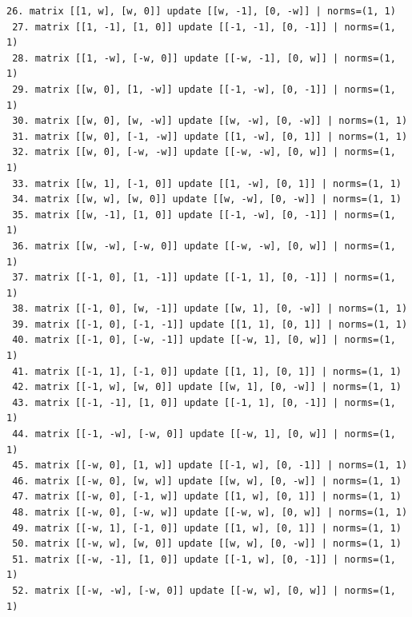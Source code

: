 \documentclass[runningheads]{llncs}
\begin{document}
\begin{lstlisting}[caption={Output candidate matrices, update matrices, and their respective norms.  The claim for \(d=1\) is easily verified from the output norms.}]
 26. matrix [[1, w], [w, 0]] update [[w, -1], [0, -w]] | norms=(1, 1)
 27. matrix [[1, -1], [1, 0]] update [[-1, -1], [0, -1]] | norms=(1, 1)
 28. matrix [[1, -w], [-w, 0]] update [[-w, -1], [0, w]] | norms=(1, 1)
 29. matrix [[w, 0], [1, -w]] update [[-1, -w], [0, -1]] | norms=(1, 1)
 30. matrix [[w, 0], [w, -w]] update [[w, -w], [0, -w]] | norms=(1, 1)
 31. matrix [[w, 0], [-1, -w]] update [[1, -w], [0, 1]] | norms=(1, 1)
 32. matrix [[w, 0], [-w, -w]] update [[-w, -w], [0, w]] | norms=(1, 1)
 33. matrix [[w, 1], [-1, 0]] update [[1, -w], [0, 1]] | norms=(1, 1)
 34. matrix [[w, w], [w, 0]] update [[w, -w], [0, -w]] | norms=(1, 1)
 35. matrix [[w, -1], [1, 0]] update [[-1, -w], [0, -1]] | norms=(1, 1)
 36. matrix [[w, -w], [-w, 0]] update [[-w, -w], [0, w]] | norms=(1, 1)
 37. matrix [[-1, 0], [1, -1]] update [[-1, 1], [0, -1]] | norms=(1, 1)
 38. matrix [[-1, 0], [w, -1]] update [[w, 1], [0, -w]] | norms=(1, 1)
 39. matrix [[-1, 0], [-1, -1]] update [[1, 1], [0, 1]] | norms=(1, 1)
 40. matrix [[-1, 0], [-w, -1]] update [[-w, 1], [0, w]] | norms=(1, 1)
 41. matrix [[-1, 1], [-1, 0]] update [[1, 1], [0, 1]] | norms=(1, 1)
 42. matrix [[-1, w], [w, 0]] update [[w, 1], [0, -w]] | norms=(1, 1)
 43. matrix [[-1, -1], [1, 0]] update [[-1, 1], [0, -1]] | norms=(1, 1)
 44. matrix [[-1, -w], [-w, 0]] update [[-w, 1], [0, w]] | norms=(1, 1)
 45. matrix [[-w, 0], [1, w]] update [[-1, w], [0, -1]] | norms=(1, 1)
 46. matrix [[-w, 0], [w, w]] update [[w, w], [0, -w]] | norms=(1, 1)
 47. matrix [[-w, 0], [-1, w]] update [[1, w], [0, 1]] | norms=(1, 1)
 48. matrix [[-w, 0], [-w, w]] update [[-w, w], [0, w]] | norms=(1, 1)
 49. matrix [[-w, 1], [-1, 0]] update [[1, w], [0, 1]] | norms=(1, 1)
 50. matrix [[-w, w], [w, 0]] update [[w, w], [0, -w]] | norms=(1, 1)
 51. matrix [[-w, -1], [1, 0]] update [[-1, w], [0, -1]] | norms=(1, 1)
 52. matrix [[-w, -w], [-w, 0]] update [[-w, w], [0, w]] | norms=(1, 1)

\end{lstlisting}
\end{document}
